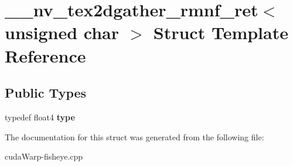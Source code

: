 \hypertarget{struct____nv__tex2dgather__rmnf__ret_3_01unsigned_01char_01_4}{}\section{\+\_\+\+\_\+nv\+\_\+tex2dgather\+\_\+rmnf\+\_\+ret$<$ unsigned char $>$ Struct Template Reference}
\label{struct____nv__tex2dgather__rmnf__ret_3_01unsigned_01char_01_4}
\subsection*{Public Types}
\begin{DoxyCompactItemize}
\item 
typedef float4 {\bfseries type}\hypertarget{struct____nv__tex2dgather__rmnf__ret_3_01unsigned_01char_01_4_af76e44277c9aec870fcd37ec3278f315}{}\label{struct____nv__tex2dgather__rmnf__ret_3_01unsigned_01char_01_4_af76e44277c9aec870fcd37ec3278f315}

\end{DoxyCompactItemize}


The documentation for this struct was generated from the following file\+:\begin{DoxyCompactItemize}
\item 
cuda\+Warp-\/fisheye.\+cpp\end{DoxyCompactItemize}

